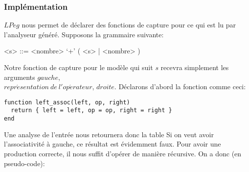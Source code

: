 \documentclass{article}
\begin{document}
\subsubsection{Implémentation}
$LPeg$ nous permet de déclarer des fonctions de capture pour ce qui est lu par l'analyseur généré. Supposons la grammaire suivante:
\begin{grammar}
	<s> ::= <nombre> `+' ( <s> | <nombre> )
\end{grammar}
Notre fonction de capture pour le modèle qui suit $s$ recevra simplement les arguments $gauche$, \\ $repr\acute{e}sentation \ de \ l'op\acute{e}rateur$, $droite$. Déclarons d'abord la fonction comme ceci:
\begin{verbatim}
function left_assoc(left, op, right)
  return { left = left, op = op, right = right }
end
\end{verbatim}
Une analyse de l'entrée  \noindent nous retournera donc la table 
\noindent Si on veut avoir l'associativité à gauche, ce résultat est évidemment faux. Pour avoir une production correcte, il nous suffit d'opérer de manière récursive. On a donc (en pseudo-code):
\end{document}

